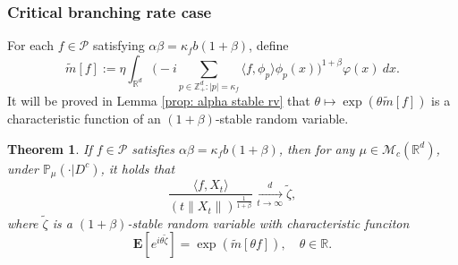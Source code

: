 \documentclass[12pt,a4paper]{amsart}
\theoremstyle{plain}
\newtheorem{thm}{Theorem}[section]
\theoremstyle{definition}
\numberwithin{equation}{section}
\begin{document}
\subsubsection{Critical branching rate case}
    For each $f\in \mathcal{P}$ satisfying $\alpha\beta=\kappa_f b(1+\beta)$, define
\begin{equation}\label{tilde-m}
    \tilde{m}[f]
    := \eta\int_{\mathbb R^d} \Big(-i\sum_{p\in \mathbb Z_+^d:|p|=\kappa_f}\langle f,\phi_p\rangle\phi_p(x)\Big)^{1+\beta} \varphi(x)~dx.
\end{equation}
    It will be proved in Lemma \ref{prop: alpha stable rv} that $\theta \mapsto \exp(\theta \tilde m[f])$ is a characteristic function of an $(1+\beta)$-stable random variable.
\begin{thm}
\label{thm: critical clt}
    If $f\in\mathcal{P}$ satisfies  $\alpha\beta=\kappa_fb(1+\beta)$, then for any $\mu\in \mathcal M_c(\mathbb R^d)$, %
    under $\mathbb{P}_{\mu}(\cdot|D^c)$, 
    it holds that
\[
    \frac{\langle f,X_t\rangle}{\left(t\|X_t\|\right)^{\frac{1}{1+\beta}}}
    \xrightarrow[t\to \infty]{d} \tilde{\zeta},
\]
    where $\tilde{\zeta}$ is a $(1+\beta)$-stable random variable with
    characteristic funciton
\[
    \mathbf E [e^{i\theta \tilde{\zeta}}]
    =\exp(\widetilde{m}[\theta f]),
    \quad \theta\in \mathbb R.
\]
\end{thm}
\end{document}
